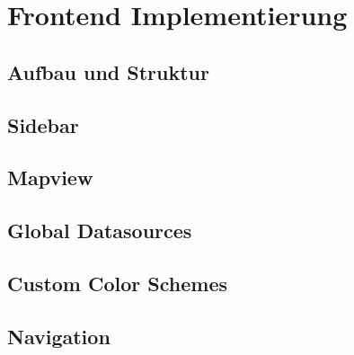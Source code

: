 \section{Frontend Implementierung}
\subsection{Aufbau und Struktur}
\subsection{Sidebar}
\subsection{Mapview}
\subsection{Global Datasources}
\subsection{Custom Color Schemes}
\subsection{Navigation}